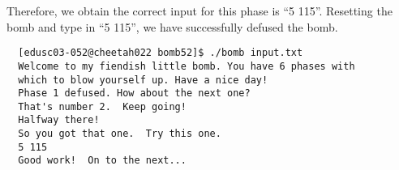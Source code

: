 Therefore, we obtain the correct input for this phase is ``5 115''. Resetting the bomb and type in ``5 115'', we have successfully defused the bomb.
{\renewcommand\fcolorbox[4][]{\textcolor{cyan}{\strut#4}}
\begin{verbatim}
  [edusc03-052@cheetah022 bomb52]$ ./bomb input.txt
  Welcome to my fiendish little bomb. You have 6 phases with
  which to blow yourself up. Have a nice day!
  Phase 1 defused. How about the next one?
  That's number 2.  Keep going!
  Halfway there!
  So you got that one.  Try this one.
  5 115
  Good work!  On to the next...
\end{verbatim}
}\noindent
\newpage